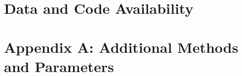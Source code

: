 \documentclass[11pt]{article}
\begin{document}

\section*{Data and Code Availability}

\section*{Appendix A: Additional Methods and Parameters}

%
%
%
%

\renewcommand{\theequation}{A\arabic{equation}}
\renewcommand{\thetable}{A\arabic{table}}
\setcounter{equation}{0}  %
\setcounter{figure}{0}
\setcounter{table}{0}

%
%


\end{document}
